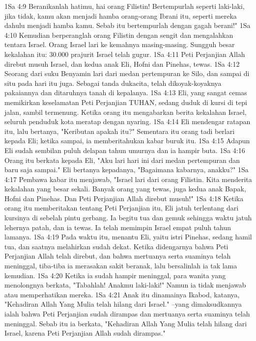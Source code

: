 1Sa 4:9  Beranikanlah hatimu, hai orang Filistin! Bertempurlah seperti laki-laki, jika tidak, kamu akan menjadi hamba orang-orang Ibrani itu, seperti mereka dahulu menjadi hamba kamu. Sebab itu bertempurlah dengan gagah berani!"
1Sa 4:10  Kemudian berperanglah orang Filistin dengan sengit dan mengalahkan tentara Israel. Orang Israel lari ke kemahnya masing-masing. Sungguh besar kekalahan itu: 30.000 prajurit Israel telah gugur.
1Sa 4:11  Peti Perjanjian Allah direbut musuh Israel, dan kedua anak Eli, Hofni dan Pinehas, tewas.
1Sa 4:12  Seorang dari suku Benyamin lari dari medan pertempuran ke Silo, dan sampai di situ pada hari itu juga. Sebagai tanda dukacita, telah dikoyak-koyaknya pakaiannya dan ditaruhnya tanah di kepalanya.
1Sa 4:13  Eli, yang sangat cemas memikirkan keselamatan Peti Perjanjian TUHAN, sedang duduk di kursi di tepi jalan, sambil termenung. Ketika orang itu mengabarkan berita kekalahan Israel, seluruh penduduk kota meratap dengan nyaring.
1Sa 4:14  Eli mendengar ratapan itu, lalu bertanya, "Keributan apakah itu?" Sementara itu orang tadi berlari kepada Eli; ketika sampai, ia memberitahukan kabar buruk itu.
1Sa 4:15  Adapun Eli sudah sembilan puluh delapan tahun umurnya dan ia hampir buta.
1Sa 4:16  Orang itu berkata kepada Eli, "Aku lari hari ini dari medan pertempuran dan baru saja sampai." Eli bertanya kepadanya, "Bagaimana kabarnya, anakku?"
1Sa 4:17  Pembawa kabar itu menjawab, "Israel lari dari orang Filistin. Kita menderita kekalahan yang besar sekali. Banyak orang yang tewas, juga kedua anak Bapak, Hofni dan Pinehas. Dan Peti Perjanjian Allah direbut musuh!"
1Sa 4:18  Ketika orang itu memberitakan tentang Peti Perjanjian itu, Eli jatuh terlentang dari kursinya di sebelah pintu gerbang. Ia begitu tua dan gemuk sehingga waktu jatuh lehernya patah, dan ia tewas. Ia telah memimpin Israel empat puluh tahun lamanya.
1Sa 4:19  Pada waktu itu, menantu Eli, yaitu istri Pinehas, sedang hamil tua, dan saatnya melahirkan sudah dekat. Ketika didengarnya bahwa Peti Perjanjian Allah telah direbut, dan bahwa mertuanya serta suaminya telah meninggal, tiba-tiba ia merasakan sakit beranak, lalu bersalinlah ia tak lama kemudian.
1Sa 4:20  Ketika ia sudah hampir meninggal, para wanita yang menolongnya berkata, "Tabahlah! Anakmu laki-laki!" Namun ia tidak menjawab atau memperhatikan mereka.
1Sa 4:21  Anak itu dinamainya Ikabod, katanya, "Kehadiran Allah Yang Mulia telah hilang dari Israel." --yang dimaksudkannya ialah bahwa Peti Perjanjian sudah dirampas dan mertuanya serta suaminya telah meninggal. Sebab itu ia berkata, "Kehadiran Allah Yang Mulia telah hilang dari Israel, karena Peti Perjanjian Allah sudah dirampas."
